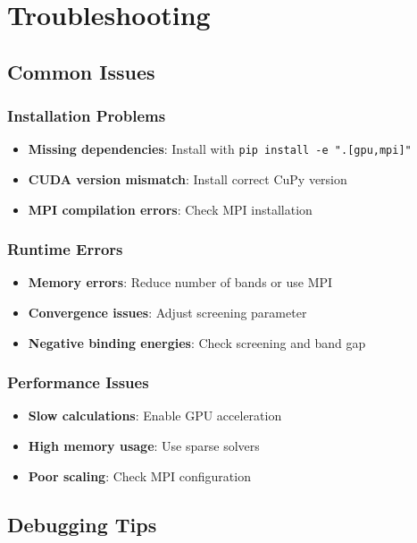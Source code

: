 \documentclass[11pt,a4paper]{article}
\newcommand{\code}[1]{\texttt{#1}}
\begin{document}
\section{Troubleshooting}

\subsection{Common Issues}

\subsubsection{Installation Problems}

\begin{itemize}
    \item \textbf{Missing dependencies}: Install with \code{pip install -e ".[gpu,mpi]"}
    \item \textbf{CUDA version mismatch}: Install correct CuPy version
    \item \textbf{MPI compilation errors}: Check MPI installation
\end{itemize}

\subsubsection{Runtime Errors}

\begin{itemize}
    \item \textbf{Memory errors}: Reduce number of bands or use MPI
    \item \textbf{Convergence issues}: Adjust screening parameter
    \item \textbf{Negative binding energies}: Check screening and band gap
\end{itemize}

\subsubsection{Performance Issues}

\begin{itemize}
    \item \textbf{Slow calculations}: Enable GPU acceleration
    \item \textbf{High memory usage}: Use sparse solvers
    \item \textbf{Poor scaling}: Check MPI configuration
\end{itemize}

\subsection{Debugging Tips}
\end{document}
